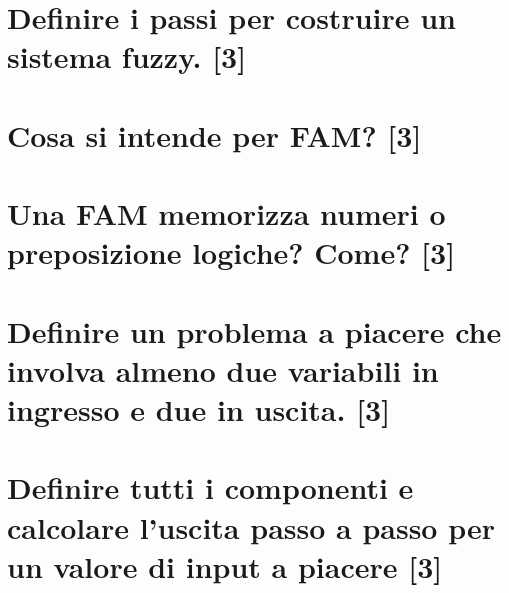 \documentclass[\main/main.tex]{subfiles}
\begin{document}
\section{Definire i passi per costruire un sistema fuzzy. [3]}
\section{Cosa si intende per FAM? [3]}
\section{Una FAM memorizza numeri o preposizione logiche? Come? [3]}
\section{Definire un problema a piacere che involva almeno due variabili in ingresso e due in uscita. [3]}
\section{Definire tutti i componenti e calcolare l'uscita passo a passo per un valore di input a piacere [3]}
\end{document}
